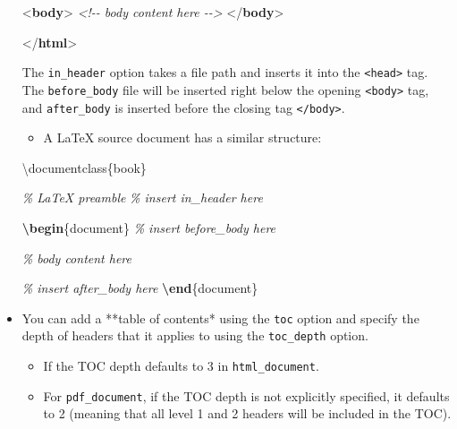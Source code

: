 \documentclass[
  a4paper,
  twoside,
  openright]{book}
\newenvironment{Shaded}{\begin{snugshade}}{\end{snugshade}}
\newcommand{\BuiltInTok}[1]{#1}
\newcommand{\CommentTok}[1]{\textcolor[rgb]{0.56,0.35,0.01}{\textit{#1}}}
\newcommand{\DataTypeTok}[1]{\textcolor[rgb]{0.13,0.29,0.53}{#1}}
\newcommand{\ExtensionTok}[1]{#1}
\newcommand{\KeywordTok}[1]{\textcolor[rgb]{0.13,0.29,0.53}{\textbf{#1}}}
\newcommand{\NormalTok}[1]{#1}
\providecommand{\tightlist}{%
  \setlength{\itemsep}{0pt}\setlength{\parskip}{0pt}}
\theoremstyle{definition}
\theoremstyle{definition}
\theoremstyle{definition}
\theoremstyle{definition}
\theoremstyle{remark}
\begin{document}
\begin{itemize}
\begin{Shaded}
\begin{Highlighting}[]
  \DataTypeTok{\textless{}}\KeywordTok{body}\DataTypeTok{\textgreater{}}
  \CommentTok{\textless{}!{-}{-} body content here {-}{-}\textgreater{}}
  \DataTypeTok{\textless{}/}\KeywordTok{body}\DataTypeTok{\textgreater{}}

\DataTypeTok{\textless{}/}\KeywordTok{html}\DataTypeTok{\textgreater{}}
\end{Highlighting}
\end{Shaded}

  The \texttt{in\_header} option takes a file path and inserts it into the \texttt{\textless{}head\textgreater{}} tag. The \texttt{before\_body} file will be inserted right below the opening \texttt{\textless{}body\textgreater{}} tag, and \texttt{after\_body} is inserted before the closing tag \texttt{\textless{}/body\textgreater{}}.

  \begin{itemize}
  \tightlist
  \item
    A LaTeX source document has a similar structure:
  \end{itemize}

\begin{Shaded}
\begin{Highlighting}[]
\BuiltInTok{\textbackslash{}documentclass}\NormalTok{\{}\ExtensionTok{book}\NormalTok{\}}

\CommentTok{\% LaTeX preamble}
\CommentTok{\% insert in\_header here}

\KeywordTok{\textbackslash{}begin}\NormalTok{\{}\ExtensionTok{document}\NormalTok{\}}
\CommentTok{\% insert before\_body here}

\CommentTok{\% body content here}

\CommentTok{\% insert after\_body here}
\KeywordTok{\textbackslash{}end}\NormalTok{\{}\ExtensionTok{document}\NormalTok{\}}
\end{Highlighting}
\end{Shaded}
\item
  You can add a **table of contents* using the \texttt{toc} option and specify the depth of headers that it applies to using the \texttt{toc\_depth} option.

  \begin{itemize}
  \tightlist
  \item
    If the TOC depth defaults to 3 in \texttt{html\_document}.
  \item
    For \texttt{pdf\_document}, if the TOC depth is not explicitly specified, it defaults to 2 (meaning that all level 1 and 2 headers will be included in the TOC).
  \end{itemize}


\end{itemize}
\end{document}
